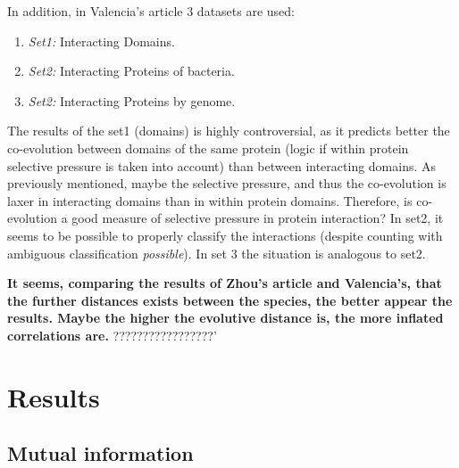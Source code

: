 \documentclass[11pt]{article}
\begin{document}
In addition, in Valencia's article\cite{Pazos2001} 3 datasets are used:
\begin{enumerate}
\setlength{\itemsep}{1pt}
	\item \textit{Set1:} Interacting Domains.
	\item \textit{Set2:} Interacting Proteins of bacteria.
	\item \textit{Set2:} Interacting Proteins by genome.
\end{enumerate}
The results of the set1 (domains) is highly controversial, as it predicts better the co-evolution between domains of the same protein (logic if within protein selective pressure is taken into account) than between interacting domains. As previously mentioned, maybe the selective pressure, and thus the co-evolution is laxer in interacting domains than in within protein domains. Therefore, is co-evolution a good measure of selective pressure in protein interaction?
In set2, it seems to be possible to properly classify the interactions (despite counting with ambiguous classification \textit{possible}). In set 3 the situation is analogous to set2.

\textbf{
\textbf{It seems, comparing the results of Zhou's article and Valencia's, that the further distances exists between the species, the better appear the results. Maybe the higher the evolutive distance is, the more inflated correlations are.}} ?????????????????'


\section{Results}
\subsection{Mutual information}


	
\end{document}
